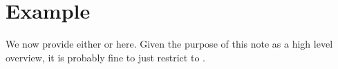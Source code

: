 \section{Example}\label{Example}
We now provide either \citet{Keane.1994} or \citet{Keane.1997} here. Given the purpose of this note as a high level overview, it is probably fine to just restrict to \citep{Keane.1994}.
